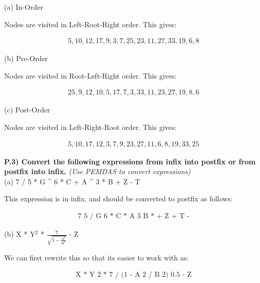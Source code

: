\documentclass[12pt]{article}
\begin{document}
\noindent (a) In-Order

\noindent Nodes are visited in Left-Root-Right order. This gives:

\begin{align*}
	\boxed{5, 10, 12, 17, 9, 3, 7, 25, 23, 11, 27, 33, 19, 6, 8}
\end{align*} 

\noindent \hdashrule[0.5ex]{\textwidth}{1pt}{3mm 2mm}

\noindent (b) Pre-Order

\noindent Nodes are visited in Root-Left-Right order. This gives:

\begin{align*}
	\boxed{25, 9, 12, 10, 5, 17, 7, 3, 33, 11, 23, 27, 19, 8, 6}
\end{align*} 

\noindent \hdashrule[0.5ex]{\textwidth}{1pt}{3mm 2mm}

\noindent (c) Post-Order

\noindent Nodes are visited in Left-Right-Root order. This gives:

\begin{align*}
	\boxed{5, 10, 17, 12, 3, 7, 9, 23, 27, 11, 6, 8, 19, 33, 25}
\end{align*} 

\newpage

\noindent \textbf{P.3) Convert the following expressions from infix into postfix or from postfix into infix.} \textit{(Use PEMDAS to convert expressions)} \\

\noindent (a) 7 / 5 * G \^{} 6 * C + A \^{} 3 * B + Z - T

\noindent This expression is in infix, and should be converted to postfix as follows:

\begin{align*}
	\boxed{\text{7 5 / G 6 \^{} * C * A 3 \^{} B * + Z + T -}}
\end{align*}

\noindent \hdashrule[0.5ex]{\textwidth}{1pt}{3mm 2mm}

\noindent (b) X * Y$^2$ * $\frac{7}{\sqrt{1-\frac{\text{A}^2}{\text{B}^2}}}$ - Z

\noindent We can first rewrite this so that its easier to work with as: 

\begin{align*}
	\text{X * Y \^{} 2 * 7 / (1 - A \^{} 2 / B \^{} 2) \^{} 0.5 - Z}
\end{align*}
\end{document}

